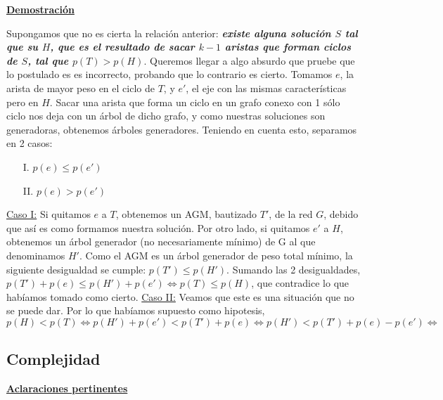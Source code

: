 \documentclass[10pt,a4paper]{article}
\begin{document}
\textbf{\underline{Demostración}}

Supongamos que no es cierta la relación anterior:\textbf{\textit{ existe alguna solución \boldmath$S$ tal que su \boldmath$H$, que es el resultado de sacar \boldmath$k-1$ aristas que forman ciclos de \boldmath$S$, tal que \boldmath$p(T) > p(H)$}}. Queremos llegar a algo absurdo que pruebe que lo postulado es es incorrecto, probando que lo contrario es cierto.
Tomamos $e$, la arista de mayor peso en el ciclo de $T$, y $e'$, el eje con las mismas características pero en $H$. Sacar una arista que forma un ciclo en un grafo conexo con 1 sólo ciclo nos deja con un árbol de dicho grafo, y como nuestras soluciones son generadoras, obtenemos árboles generadores. Teniendo en cuenta esto, separamos en 2 casos:
\begin{enumerate}
\item[I.] $p(e) \leq p(e')$ 
\item[II.] $p(e) > p(e')$
\end{enumerate}

\underline{Caso I:} Si quitamos $e$ a $T$, obtenemos un AGM, bautizado $T'$, de la red $G$, debido que así es como formamos nuestra solución. Por otro lado, si quitamos $e'$ a $H$, obtenemos un árbol generador (no necesariamente mínimo) de G al que denominamos $H'$. Como el AGM es un árbol generador de peso total mínimo, la siguiente desigualdad se cumple: $p(T') \leq p(H')$. Sumando las 2 desigualdades, $p(T') + p(e) \leq p(H') + p(e') \iff p(T) \leq p(H)$, que contradice lo que habíamos tomado como cierto.\newline
\indent \underline{Caso II:} Veamos que este es una situación que no se puede dar. Por lo que habíamos supuesto como hipotesis, $p(H) < p(T) \iff p(H') + p(e') < p(T') + p(e) \iff p(H') < p(T') + p(e) - p(e') \iff$
\subsection{Complejidad}

\noindent \textbf{\underline{Aclaraciones pertinentes}}
\end{document}
